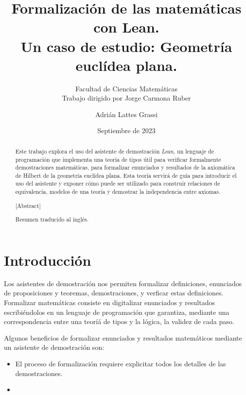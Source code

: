 \documentclass[12pt, spanish]{TFG}
\title{Formalización de las matemáticas con Lean.\\ Un caso de estudio: Geometría euclídea plana.}
\date{Septiembre de 2023}
\author{Adrián Lattes Grassi}
\subtitle{Facultad de Ciencias Matemáticas\\Trabajo dirigido por Jorge Carmona Ruber}
\begin{document}
\maketitle
\emptypage


\begin{abstract}

  Este trabajo explora el uso del asistente de demostración \textit{Lean}, un
  lenguaje de programación que implementa una teoría de tipos útil para
  verificar formalmente demostraciones matemáticas, para formalizar enunciados 
  y resultados de la axiomática de Hilbert de la geometría euclídea plana. Esta
  teoría servirá de guía para introducir el uso del asistente y exponer cómo
  puede ser utilizado para construir relaciones de equivalencia, modelos de
  una teoría y demostrar la independencia entre axiomas.

\end{abstract}

\begin{abstract}[Abstract]

 Resumen traducido al inglés.

\end{abstract}

\newpage

\tableofcontents
\newpage


\section*{Introducción}

Los asistentes de demostración nos permiten formalizar definiciones, enunciados
de proposiciones y teoremas, demostraciones, y verficar estas definiciones.
Formalizar matemáticas consiste en digitalizar enunciados y resultados
escribiéndolos en un lenguaje de programación que garantiza, mediante una
correspondencia entre una teoríá de tipos y la lógica, la validez de cada paso.

Algunos beneficios de formalizar enunciados y resultados matemáticos mediante un
asistente de demostración son:

\begin{itemize} 

  \item El proceso de formalización requiere explicitar todos los detalles de
      las demostraciones. 

  \item 

\end{itemize}
\end{document}
